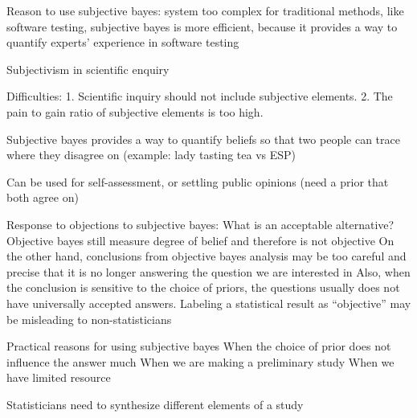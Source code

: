 \documentclass{amsart}
\begin{document}
Reason to use subjective bayes: system too complex for traditional methods,
like software testing, subjective bayes is more efficient, because it provides a way to quantify experts' experience in software testing

Subjectivism in scientific enquiry

Difficulties:
1. Scientific inquiry should not include subjective elements.
2. The pain to gain ratio of subjective elements is too high.

Subjective bayes provides a way to quantify beliefs so that two people can trace where they disagree on (example: lady tasting tea vs ESP)

Can be used for self-assessment, or settling public opinions (need a prior that both agree on)

Response to objections to subjective bayes:
What is an acceptable alternative?
Objective bayes still measure degree of belief and therefore is not objective
On the other hand, conclusions from objective bayes analysis may be too careful and precise that it is no longer answering the question we are interested in
Also, when the conclusion is sensitive to the choice of priors, the questions usually does not have universally accepted answers.
Labeling a statistical result as ``objective'' may be misleading to non-statisticians

Practical reasons for using subjective bayes
When the choice of prior does not influence the answer much
When we are making a preliminary study
When we have limited resource

Statisticians need to synthesize different elements of a study
\end{document}
